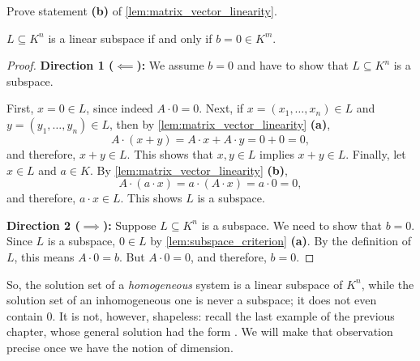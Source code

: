 \begin{exercise}
\label{exc:matrix_vector_scalar}
Prove statement \textbf{(b)} of \cref{lem:matrix_vector_linearity}.
\end{exercise}

\begin{theorem}
\label{thm:solution_set_subspace}
$L \subseteq K^n$ is a linear subspace if and only if $b = 0 \in K^m$.
\end{theorem}

\begin{proof}
\textbf{Direction 1 ($\impliedby$):} We assume $b = 0$ and have to show that $L \subseteq K^n$ is a subspace.

First, $x = 0 \in L$, since indeed $A \cdot 0 = 0$. Next, if $x = (x_1, \dots, x_n) \in L$ and $y = (y_1, \dots, y_n) \in L$, then by \cref{lem:matrix_vector_linearity} \textbf{(a)},
\[
A \cdot (x + y) = A \cdot x + A \cdot y = 0 + 0 = 0,
\]
and therefore, $x + y \in L$. This shows that $x, y \in L$ implies $x + y \in L$. Finally, let $x \in L$ and $a \in K$. By \cref{lem:matrix_vector_linearity} \textbf{(b)},
\[
A \cdot (a \cdot x) = a \cdot (A \cdot x) = a \cdot 0 = 0,
\]
and therefore, $a \cdot x \in L$. This shows $L$ is a subspace.

\textbf{Direction 2 ($\implies$):} Suppose $L \subseteq K^n$ is a subspace. We need to show that $b = 0$. Since $L$ is a subspace, $0 \in L$ by \cref{lem:subspace_criterion} \textbf{(a)}. By the definition of $L$, this means $A \cdot 0 = b$. But $A \cdot 0 = 0$, and therefore, $b = 0$.
\end{proof}

\begin{importantremark}
\label{rem:homogeneous_vs_inhomogeneous}
So, the solution set of a \emph{homogeneous} system is a linear subspace of $K^n$, while the solution set of an inhomogeneous one is never a subspace; it does not even contain $0$. It is not, however, shapeless: recall the last example of the previous chapter, whose general solution had the form . We will make that observation precise once we have the notion of dimension.
\end{importantremark}

